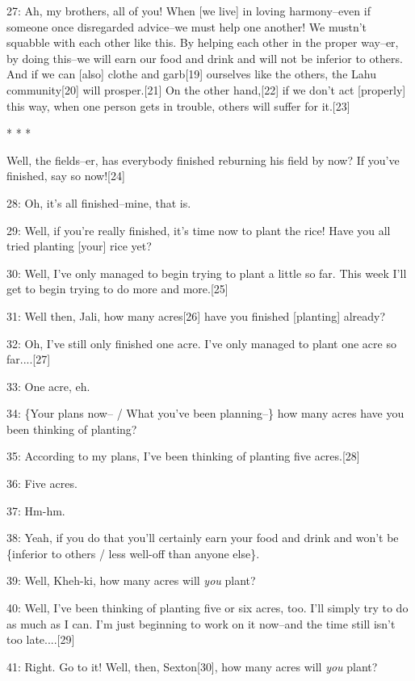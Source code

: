 27: Ah, my brothers, all of you! When [we live] in loving harmony--even if  someone
once disregarded advice--we must help one another! We mustn't squabble with each
other like this. By helping each other in the proper way--er, by doing this--we
will earn our food and drink and will not be inferior to others. And if we can
[also] clothe and garb[19] ourselves like the others, the Lahu community[20] will
prosper.[21] On the other hand,[22] if we don't act [properly] this way, when one
person gets in trouble, others will suffer for it.[23]

\begin{center}
* * *
\end{center}

\leftskip=0pt
Well, the fields--er, has everybody finished reburning his field by now? If you've
finished, say so now![24]

28: Oh, it's all finished--mine, that is.

29: Well, if you're really finished, it's time now to plant the rice! Have you
all tried planting [your] rice yet?

30: Well, I've only managed to begin trying to plant a little so far. This week
I'll get to begin trying to do more and more.[25]

31: Well then, Jali, how many acres[26] have you finished [planting] already?

32: Oh, I've still only finished one acre. I've only managed to plant one acre
so far....[27]

33: One acre, eh.

34: \{Your plans now-- / What you've been planning--\} how many acres have you
been thinking of planting?

35: According to my plans, I've been thinking of planting five acres.[28]

36: Five acres.

37: Hm-hm.

38: Yeah, if you do that you'll certainly earn your food and drink and won't be
\{inferior to others / less well-off than anyone else\}.

39: Well, Kheh-ki, how many acres will \emph{you} plant?

40: Well, I've been thinking of planting five or six acres, too. I'll simply try
to do as much as I can. I'm just beginning to work on it now--and the time still
isn't too late....[29]

41: Right. Go to it! Well, then, Sexton[30], how many acres will \emph{you} plant?

